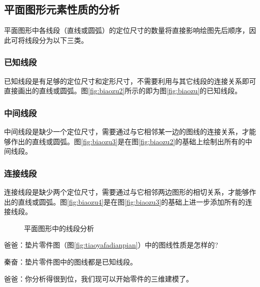 \subsection{平面图形元素性质的分析}
平面图形中各线段（直线或圆弧）的定位尺寸的数量将直接影响绘图先后顺序，因此可将线段分为以下三类。

\subsubsection{已知线段}
已知线段是有足够的定位尺寸和定形尺寸，不需要利用与其它线段的连接关系即可直接画出的直线或圆弧。图\ref{fig:biaozu2}所示的即为图\ref{fig:biaozu}的已知线段。

\subsubsection{中间线段} 

中间线段是缺少一个定位尺寸，需要通过与它相邻某一边的图线的连接关系，才能够作出的直线或圆弧。图\ref{fig:biaozu3}是在图\ref{fig:biaozu2}的基础上绘制出所有的中间线段。
\subsubsection{连接线段} 

连接线段是缺少两个定位尺寸，需要通过与它相邻两边图形的相切关系，才能够作出的直线或圆弧。图\ref{fig:biaozu4}是在图\ref{fig:biaozu3}的基础上进一步添加所有的连接线段。

\begin{figure}[htbp]
\centering
{}\hspace{20pt}
\hspace{20pt}
\caption{平面图形中的线段分析}
\end{figure}

爸爸：垫片零件图（图\ref{fig:tiaoyafadianpian}）中的图线性质是怎样的?

秦奋：垫片零件图中的图线都是已知线段。

爸爸：你分析得很到位，我们现可以开始零件的三维建模了。